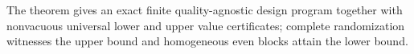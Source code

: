 The theorem gives an exact finite quality-agnostic design program together with nonvacuous universal lower and upper value certificates; complete randomization witnesses the upper bound and homogeneous even blocks attain the lower bound.